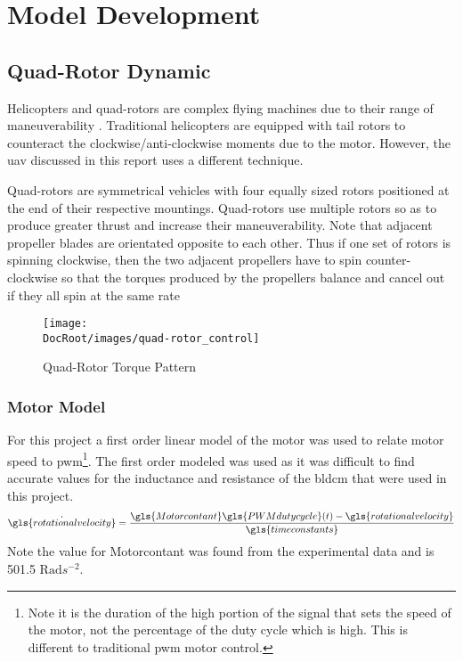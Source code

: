 \chapter{Model Development}




\section{Quad-Rotor Dynamic} \label{sec: quad-model}


Helicopters and quad-rotors are complex flying machines due to their range of maneuverability \cite{Quadrotor_Helicopter_Flight_Dynamics_and_Control, Modelling_and_Control_of_a_Quad_Rotor_Robot}. Traditional helicopters are equipped with tail rotors to counteract the clockwise/anti-clockwise moments due to the motor. However, the \gls{uav} discussed in this report uses a different technique.

Quad-rotors are symmetrical vehicles with four equally sized rotors positioned at the end of their respective mountings. Quad-rotors use  multiple rotors so as to produce greater thrust and increase their maneuverability. Note that adjacent propeller blades are orientated opposite to each other. Thus if one set of rotors is spinning clockwise, then the two adjacent propellers have to spin counter-clockwise so that the torques produced by the propellers balance and cancel out if they all spin at the same rate

\begin{figure}[h]
	\centering
	\texttt{[image: \\DocRoot/images/quad-rotor\_control]}
	\caption{Quad-Rotor Torque Pattern}
	\label{Fig:Quad-Rotor Torque Pattern}
\end{figure}







\subsection{Motor Model}\label{eq: quad rotor model}
For this project a first order linear model of the motor was used to relate motor speed to \gls{pwm}\footnote{ Note it is the duration of the high portion of the signal that sets the speed of the motor, not the percentage of the duty cycle which is high. This is different to traditional \gls{pwm} motor control. }. The first order modeled was used as it was difficult to find accurate values for the inductance and resistance of  the \gls{bldcm} that were used in this project.
\begin{align}
	\dot{\gls{rotationalvelocity}}=\frac{\gls{Motorcontant}\gls{PWMdutycycle}(t) - \gls{rotationalvelocity} }{\gls{timeconstants}}
\end{align}
Note the value for \gls{Motorcontant} was found from the experimental data and is 501.5 $\mathrm{Rad}s^{-2}$.

